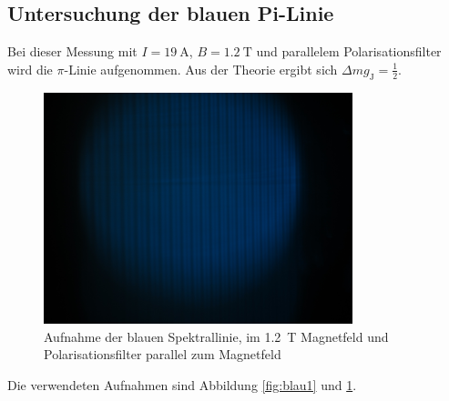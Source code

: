 \subsection{Untersuchung der blauen Pi-Linie}

Bei dieser Messung mit $I = \SI{19}{\ampere}$, $B = \SI{1.2}{\tesla}$ und parallelem Polarisationsfilter wird die $\pi$-Linie aufgenommen. Aus der Theorie ergibt sich $\Delta m g_\text{J} = \frac{1}{2}$.

\begin{figure}
	\centering
	\includegraphics[width=0.8\textwidth]{img/blau-19A-parallel.JPG}
	\caption{Aufnahme der blauen Spektrallinie, im \SI{1.2}{\tesla} Magnetfeld und Polarisationsfilter parallel zum Magnetfeld}
	\label{fig:blau3}
\end{figure}
Die verwendeten Aufnahmen sind Abbildung \ref{fig:blau1} und \ref{fig:blau3}.

